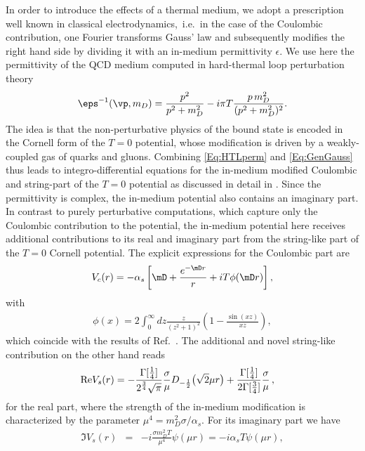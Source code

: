 In order to introduce the effects of a thermal medium, we adopt a prescription well known in classical electrodynamics,~i.e.~in the case of the Coulombic contribution, one Fourier transforms Gauss' law and subsequently modifies the right hand side by dividing it with an in-medium permittivity $\epsilon$. We use here the permittivity of the QCD medium computed in hard-thermal loop perturbation theory  
\begin{align}
\eps^{-1}(\vp,m_D)=\frac{p^2}{p^2+m_D^2}-i\pi T \frac{p\, m_D^2}{(p^2+m_D^2)^2}.\label{Eq:HTLperm}
\end{align}
The idea is that the non-perturbative physics of the bound state is encoded in the Cornell form of the $T=0$ potential, whose modification is driven by a weakly-coupled gas of quarks and gluons. Combining \eqref{Eq:HTLperm} and \eqref{Eq:GenGauss} thus leads to integro-differential equations for the in-medium modified Coulombic and string-part of the $T=0$ potential as discussed in detail in \cite{Burnier:2015nsa}. Since the permittivity is complex, the in-medium potential also contains an imaginary part. In contrast to purely perturbative computations, which capture only the Coulombic contribution to the potential, the in-medium potential here receives additional contributions to its real and imaginary part from the string-like part of the $T=0$ Cornell potential. The explicit expressions for the Coulombic part are
\begin{align}
V_c(r)= -\alpha_s\left[\mD+\frac{e^{-\mD r}}{r}
+iT\phi(\mD r)\right] \label{Eq:VHTL},
\end{align}
with 
\begin{align}
\phi(x)=2 \int_0^\infty dz \frac{z}{(z^2+1)^2}\left(1-\frac{\sin(xz)}{xz}\right),\label{phi}
\end{align}
which coincide with the results of Ref.~\cite{Laine:2006ns}.
The additional and novel string-like contribution on the other hand reads
\begin{align}
{\rm Re}V_s(r)&=-\frac{\Gamma[\frac{1}{4}]}{2^{\frac{3}{4}}\sqrt{\pi}}\frac{\sigma}{\mu} D_{-\frac{1}{2}}\big(\sqrt{2}\mu r\big)+ \frac{\Gamma[\frac{1}{4}]}{2\Gamma[\frac{3}{4}]} \frac{\sigma}{\mu} \, ,
\end{align}
for the real part, where the strength of the in-medium modification is characterized by the parameter $\mu^4=m_D^2 \sigma/\alpha_s$. For its imaginary part we have 
\begin{eqnarray}
\Im V_s(r)&=&-i\frac{\sigma m_D^2 T}{\mu^4} \psi(\mu r)=-i\alpha_s T \psi(\mu r)\label{Eq:ImVSGenGauss},
\end{eqnarray}
